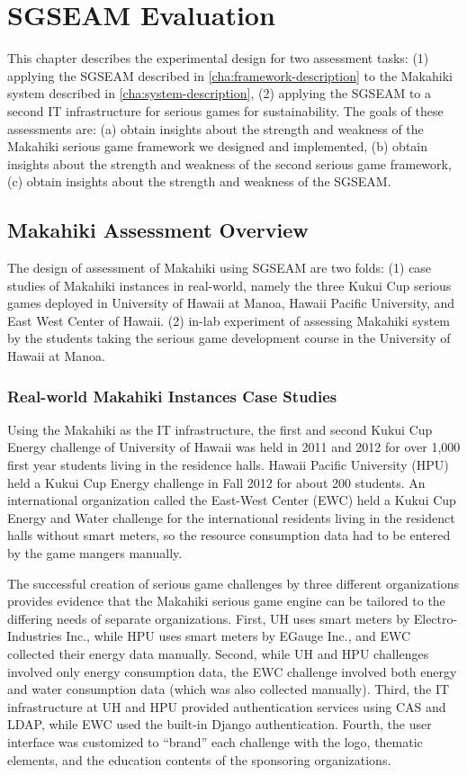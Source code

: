 \chapter{SGSEAM Evaluation}
\label{cha:ExperimentalDesign}

This chapter describes the experimental design for two assessment tasks: (1) applying the SGSEAM described in \autoref{cha:framework-description} to the Makahiki system described in \autoref{cha:system-description}, (2) applying the SGSEAM to a second IT infrastructure for serious games for sustainability. The goals of these assessments are: (a) obtain insights about
 the strength and weakness of the Makahiki serious game framework we designed and implemented,
 (b) obtain insights about
 the strength and weakness of the second serious game framework,
 (c) obtain insights about the strength and weakness of the SGSEAM.

\section{Makahiki Assessment Overview}
The design of assessment of Makahiki using SGSEAM are two folds: (1) case studies of Makahiki instances in real-world, namely the three Kukui Cup serious games deployed in University of Hawaii at Manoa, Hawaii Pacific University, and East West Center of Hawaii. (2) in-lab experiment of assessing Makahiki system by the students taking the serious game development course in the University of Hawaii at Manoa.

\subsection{Real-world Makahiki Instances Case Studies}

Using the Makahiki as the IT infrastructure, the first and second Kukui Cup Energy challenge of University of Hawaii was held in 2011 and 2012 for over 1,000 first year students living in the residence halls. Hawaii Pacific University (HPU) held a Kukui Cup Energy challenge in Fall 2012 for about 200 students. An international organization called the East-West Center (EWC) held a Kukui Cup Energy and Water challenge for the international residents living in the residenct halls without smart meters, so the resource consumption data had to be entered by the game mangers manually.

The successful creation of serious game challenges by three different organizations provides evidence that the Makahiki serious game engine can be tailored to the differing needs of separate organizations. First, UH uses smart meters by Electro-Industries Inc., while HPU uses smart meters by EGauge Inc., and EWC collected their energy data manually. Second, while UH and HPU challenges involved only energy consumption data, the EWC challenge involved both energy and water consumption data (which was also collected manually).  Third, the IT infrastructure at UH and HPU provided authentication services using CAS and LDAP, while EWC used the built-in Django authentication. Fourth, the user interface was customized to ``brand'' each challenge with the logo, thematic elements, and the education contents of the sponsoring organizations.

